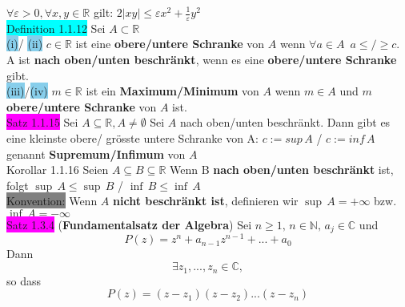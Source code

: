 \documentclass[landscape, 10pt]{article}
\newcommand{\R}{\mathbb{R}}
\newcommand{\N}{\mathbb{N}}
\newcommand{\C}{\mathbb{C}}
\begin{document}
\begin{multicols}{3}
                     \textcolor{NavyBlue}{
                     $\forall\varepsilon >0, \forall x,y\in\R$} 
                     gilt: \qquad \textcolor{NavyBlue}{
                     $2|xy|\leqslant\varepsilon x^2+\frac{1}{\varepsilon}y^2$}\\
              \colorbox{cyan}{Definition 1.1.12} 
                     Sei $A\subset\R$\\
                     \colorbox{SkyBlue}{(i)}/
                     \colorbox{SkyBlue}{(ii)} 
                            $c\in\R$ ist eine 
                            \textbf{obere/untere Schranke }
                            von $A$ wenn \textcolor{NavyBlue}{
                            $\forall a \in A \enspace a\leqslant / \geqslant c$}. 
                            A ist \textbf{nach oben/unten beschränkt}, 
                            wenn es eine \textbf{obere/untere Schranke} gibt.\\
                     \colorbox{SkyBlue}{(iii)}/\colorbox{SkyBlue}{(iv)} 
                            $m\in\R$ ist ein 
                            \textbf{Maximum/Minimum} von $A$ wenn $m\in A$ und 
                            $m$ \textbf{obere/untere Schranke} von $A$ ist. \\
              \colorbox{magenta}{Satz 1.1.15}  
                     Sei $A\subseteq\R, A\neq\emptyset$ Sei $A$ 
                     nach oben/unten beschränkt. 
                     Dann gibt es eine kleinste obere/ grösste 
                     untere Schranke von A: \quad \textcolor{NavyBlue}{
                     $c:=sup\,A$ / $c:=inf\,A$}  genannt 
                     \textbf{Supremum/Infimum} von $A$ \\
              \colorbox{BurntOrange}{Korollar 1.1.16} 
                     Seien \textcolor{NavyBlue}{
                     $A\subseteq B\subseteq\R$} Wenn B \textbf{nach oben/unten 
                     beschränkt} ist, folgt \textcolor{NavyBlue}{
                     $\sup\,A\leqslant \sup\,B$ / $\inf\,B\leqslant \inf\,A$}\\
              \colorbox{gray}{Konvention:} 
                     Wenn $A$ \textbf{nicht beschränkt ist}, definieren wir 
                     \textcolor{NavyBlue}{$\sup\,A=+\infty$} bzw. 
                     \textcolor{NavyBlue}{$\inf\,A=-\infty$}\\
              \colorbox{magenta}{Satz 1.3.4} 
              (\textbf{Fundamentalsatz der Algebra}) 
                     Sei $n\geqslant 1,\,n\in\N,\,a_j\in\C$ und 
                     \begin{equation*}
                            P(z)=z^n+a_{n-1}z^{n-1}+...+a_0
                     \end{equation*}
                     Dann 
                     \begin{equation*}
                            \exists z_1,...,z_n\in\C,
                     \end{equation*}
                     so dass
                     \begin{equation*}
                            P(z)=(z-z_1)(z-z_2)...(z-z_n)
                     \end{equation*}

\end{multicols}
\end{document}
